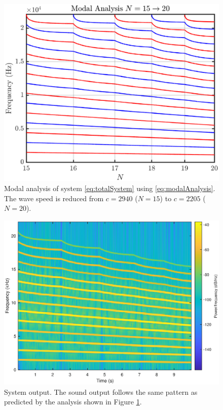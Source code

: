 \begin{figure}[ht]
    \centering
\includegraphics[width=\figwidth\columnwidth]{Figures/modalAnalysisQuadratic.eps}
\caption{\label{fig:modalAnalysis}{Modal analysis of system \eqref{eq:totalSystem} using \eqref{eq:modalAnalysis}. The wave speed is reduced from $c = 2940$ ($N = 15$) to $c = 2205$ ($N = 20$).}}
\end{figure} 
\begin{figure}[ht]
    \centering
\includegraphics[width=\figwidth\columnwidth]{Figures/specQuadratic.eps}
\caption{\label{fig:spectrogram}{System output. The sound output follows the same pattern as predicted by the analysis shown in Figure \ref{fig:modalAnalysis}.}}
\end{figure} 

